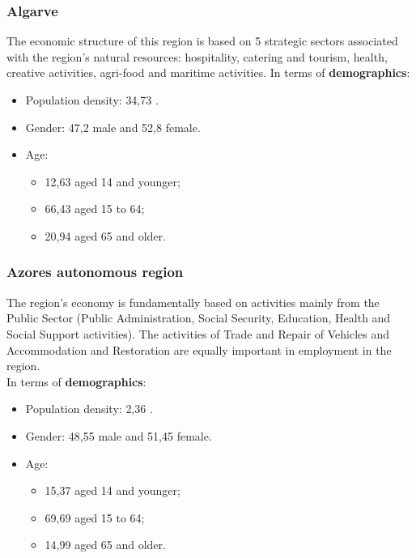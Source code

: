 \subsubsection{Algarve}
The economic structure of this region is based on 5 strategic sectors associated with the region's natural resources: hospitality, catering and tourism, health, creative activities, agri-food and maritime activities. 
In terms of {\textbf{demographics}}:
    \begin{itemize}
        \item Population density: {34,73\textdiscount} . 
        \item Gender: {47,2\textdiscount} male and {52,8\textdiscount} female.
        \item Age: 
        \begin{itemize}
        \item {12,63\textdiscount} aged 14 and younger;
        \item {66,43\textdiscount} aged 15 to 64;
        \item {20,94\textdiscount} aged 65 and older.
        \end{itemize}
    \end{itemize}
    
\subsubsection{Azores autonomous region}
The region's economy is fundamentally based on activities mainly from the Public Sector (Public Administration, Social Security, Education, Health and Social Support activities). The activities of Trade and Repair of Vehicles and Accommodation and Restoration are equally important in employment in the region. \\
In terms of {\textbf{demographics}}:
    \begin{itemize}
        \item Population density: {2,36\textdiscount} . 
        \item Gender: {48,55\textdiscount} male and {51,45\textdiscount} female.
        \item Age: 
        \begin{itemize}
        \item {15,37\textdiscount} aged 14 and younger;
        \item {69,69\textdiscount} aged 15 to 64;
        \item {14,99\textdiscount} aged 65 and older.
        \end{itemize}
    \end{itemize}
    
